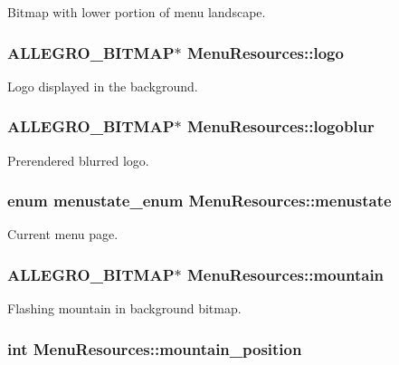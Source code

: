 Bitmap with lower portion of menu landscape. \hypertarget{structMenuResources_a11983415130445869f26bda4d12272e6}{
\subsubsection[{logo}]{\setlength{\rightskip}{0pt plus 5cm}A\+L\+L\+E\+G\+R\+O\+\_\+\+B\+I\+T\+M\+A\+P$\ast$ Menu\+Resources\+::logo}}\label{structMenuResources_a11983415130445869f26bda4d12272e6}
Logo displayed in the background. \hypertarget{structMenuResources_a3dfab6a60817a4d1ca567c972e95f8b3}{
\subsubsection[{logoblur}]{\setlength{\rightskip}{0pt plus 5cm}A\+L\+L\+E\+G\+R\+O\+\_\+\+B\+I\+T\+M\+A\+P$\ast$ Menu\+Resources\+::logoblur}}\label{structMenuResources_a3dfab6a60817a4d1ca567c972e95f8b3}
Prerendered blurred logo. \hypertarget{structMenuResources_a14a8fefd558cf4abab26b7736545f24e}{
\subsubsection[{menustate}]{\setlength{\rightskip}{0pt plus 5cm}enum {\bf menustate\+\_\+enum} Menu\+Resources\+::menustate}}\label{structMenuResources_a14a8fefd558cf4abab26b7736545f24e}
Current menu page. \hypertarget{structMenuResources_a2e838d21a796a612e8850639afd9641e}{
\subsubsection[{mountain}]{\setlength{\rightskip}{0pt plus 5cm}A\+L\+L\+E\+G\+R\+O\+\_\+\+B\+I\+T\+M\+A\+P$\ast$ Menu\+Resources\+::mountain}}\label{structMenuResources_a2e838d21a796a612e8850639afd9641e}
Flashing mountain in background bitmap. \hypertarget{structMenuResources_a938793327e62bf52beb12782a0aeb7c4}{
\subsubsection[{mountain\+\_\+position}]{\setlength{\rightskip}{0pt plus 5cm}int Menu\+Resources\+::mountain\+\_\+position}}\label{structMenuResources_a938793327e62bf52beb12782a0aeb7c4}
